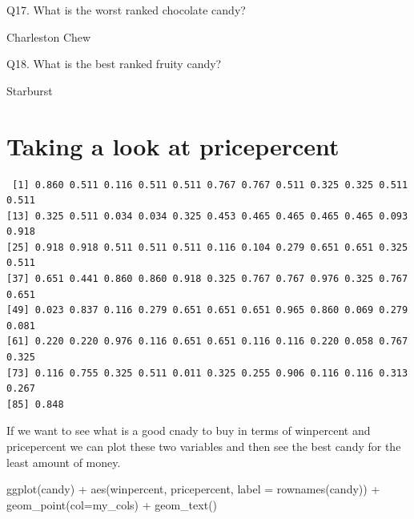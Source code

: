 \documentclass[
  letterpaper,
  DIV=11,
  numbers=noendperiod]{scrartcl}
\newenvironment{Shaded}{\begin{snugshade}}{\end{snugshade}}
\newcommand{\AttributeTok}[1]{\textcolor[rgb]{0.40,0.45,0.13}{#1}}
\newcommand{\FunctionTok}[1]{\textcolor[rgb]{0.28,0.35,0.67}{#1}}
\newcommand{\NormalTok}[1]{\textcolor[rgb]{0.00,0.23,0.31}{#1}}
\newcommand{\SpecialCharTok}[1]{\textcolor[rgb]{0.37,0.37,0.37}{#1}}
\begin{document}
Q17. What is the worst ranked chocolate candy?

Charleston Chew

Q18. What is the best ranked fruity candy?

Starburst

\hypertarget{taking-a-look-at-pricepercent}{%
\section{Taking a look at
pricepercent}\label{taking-a-look-at-pricepercent}}

\begin{Shaded}
\end{Shaded}

\begin{verbatim}
 [1] 0.860 0.511 0.116 0.511 0.511 0.767 0.767 0.511 0.325 0.325 0.511 0.511
[13] 0.325 0.511 0.034 0.034 0.325 0.453 0.465 0.465 0.465 0.465 0.093 0.918
[25] 0.918 0.918 0.511 0.511 0.511 0.116 0.104 0.279 0.651 0.651 0.325 0.511
[37] 0.651 0.441 0.860 0.860 0.918 0.325 0.767 0.767 0.976 0.325 0.767 0.651
[49] 0.023 0.837 0.116 0.279 0.651 0.651 0.651 0.965 0.860 0.069 0.279 0.081
[61] 0.220 0.220 0.976 0.116 0.651 0.651 0.116 0.116 0.220 0.058 0.767 0.325
[73] 0.116 0.755 0.325 0.511 0.011 0.325 0.255 0.906 0.116 0.116 0.313 0.267
[85] 0.848
\end{verbatim}

If we want to see what is a good cnady to buy in terms of winpercent and
pricepercent we can plot these two variables and then see the best candy
for the least amount of money.

\begin{Shaded}
\begin{Highlighting}[]
\FunctionTok{ggplot}\NormalTok{(candy) }\SpecialCharTok{+}
  \FunctionTok{aes}\NormalTok{(winpercent, pricepercent, }\AttributeTok{label =} \FunctionTok{rownames}\NormalTok{(candy)) }\SpecialCharTok{+} 
  \FunctionTok{geom\_point}\NormalTok{(}\AttributeTok{col=}\NormalTok{my\_cols) }\SpecialCharTok{+} 
  \FunctionTok{geom\_text}\NormalTok{()}
\end{Highlighting}
\end{Shaded}
\end{document}
